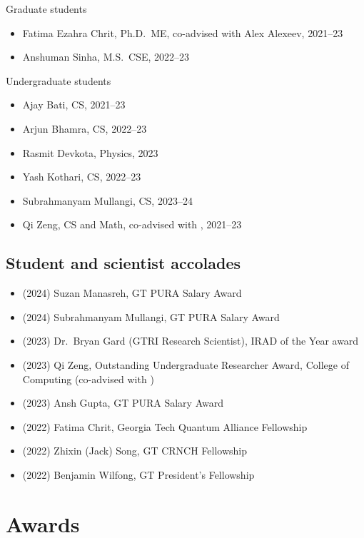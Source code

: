 Graduate students
\begin{itemize}
    \item Fatima Ezahra Chrit, Ph.D.\ ME, co-advised with Alex Alexeev, 2021--23
    \item Anshuman Sinha, M.S.\ CSE, 2022--23
\end{itemize}

Undergraduate students
\begin{itemize}
    \item Ajay Bati, CS, 2021--23
    \item Arjun Bhamra, CS, 2022--23
    \item Rasmit Devkota, Physics, 2023
    \item Yash Kothari, CS, 2022--23
    \item Subrahmanyam Mullangi, CS, 2023--24
    \item Qi Zeng, CS and Math, co-advised with \Florian, 2021--23
\end{itemize}

\subsection{Student and scientist accolades}

\begin{itemize}
    \item (2024) Suzan Manasreh, GT PURA Salary Award
    \item (2024) Subrahmanyam Mullangi, GT PURA Salary Award
    \item (2023) Dr.\ Bryan Gard (GTRI Research Scientist), IRAD of the Year award
    \item (2023) Qi Zeng, Outstanding Undergraduate Researcher Award, College of Computing (co-advised with \Florian)
    \item (2023) Ansh Gupta, GT PURA Salary Award
    \item (2022) Fatima Chrit, Georgia Tech Quantum Alliance Fellowship
    \item (2022) Zhixin (Jack) Song, GT CRNCH Fellowship
    \item (2022) Benjamin Wilfong, GT President's Fellowship
\end{itemize}

\section{Awards}

